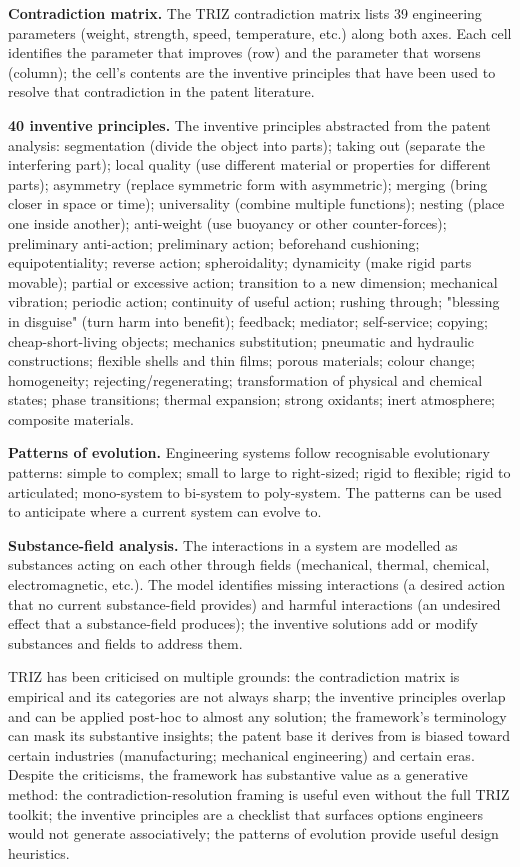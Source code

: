 \textbf{Contradiction matrix.} The TRIZ contradiction matrix lists 39 engineering parameters (weight, strength, speed, temperature, etc.) along both axes. Each cell identifies the parameter that improves (row) and the parameter that worsens (column); the cell's contents are the inventive principles that have been used to resolve that contradiction in the patent literature.

\textbf{40 inventive principles.} The inventive principles abstracted from the patent analysis: segmentation (divide the object into parts); taking out (separate the interfering part); local quality (use different material or properties for different parts); asymmetry (replace symmetric form with asymmetric); merging (bring closer in space or time); universality (combine multiple functions); nesting (place one inside another); anti-weight (use buoyancy or other counter-forces); preliminary anti-action; preliminary action; beforehand cushioning; equipotentiality; reverse action; spheroidality; dynamicity (make rigid parts movable); partial or excessive action; transition to a new dimension; mechanical vibration; periodic action; continuity of useful action; rushing through; "blessing in disguise" (turn harm into benefit); feedback; mediator; self-service; copying; cheap-short-living objects; mechanics substitution; pneumatic and hydraulic constructions; flexible shells and thin films; porous materials; colour change; homogeneity; rejecting/regenerating; transformation of physical and chemical states; phase transitions; thermal expansion; strong oxidants; inert atmosphere; composite materials.

\textbf{Patterns of evolution.} Engineering systems follow recognisable evolutionary patterns: simple to complex; small to large to right-sized; rigid to flexible; rigid to articulated; mono-system to bi-system to poly-system. The patterns can be used to anticipate where a current system can evolve to.

\textbf{Substance-field analysis.} The interactions in a system are modelled as substances acting on each other through fields (mechanical, thermal, chemical, electromagnetic, etc.). The model identifies missing interactions (a desired action that no current substance-field provides) and harmful interactions (an undesired effect that a substance-field produces); the inventive solutions add or modify substances and fields to address them.

TRIZ has been criticised on multiple grounds: the contradiction matrix is empirical and its categories are not always sharp; the inventive principles overlap and can be applied post-hoc to almost any solution; the framework's terminology can mask its substantive insights; the patent base it derives from is biased toward certain industries (manufacturing; mechanical engineering) and certain eras. Despite the criticisms, the framework has substantive value as a generative method: the contradiction-resolution framing is useful even without the full TRIZ toolkit; the inventive principles are a checklist that surfaces options engineers would not generate associatively; the patterns of evolution provide useful design heuristics.

